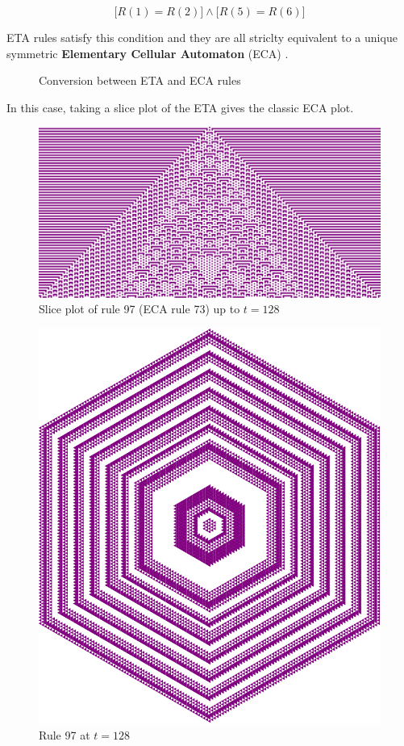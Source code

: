 \documentclass{article}
\begin{document}
\begin{equation}
    \Big[R(1)=R(2)\Big] \land \Big[R(5)=R(6)\Big]
\end{equation}

 ETA rules satisfy this condition and they are all striclty equivalent to a unique symmetric \textbf{Elementary Cellular Automaton} (ECA) \cite{wolfram2002new}.

\begin{figure}[H]
    \centering
    \caption{Conversion between ETA and ECA rules}
    \label{fig:ETA-to-ECA}
\end{figure}

\noindent In this case, taking a slice plot of the ETA gives the classic ECA plot.

\begin{figure}[H]
    \centering
    \includegraphics[width=.65\textwidth]{graphics/behavior/elementary-cellular-automata/rule-97-slice-plot-128.png}
    \caption{Slice plot of rule 97 (ECA rule 73) up to $t=128$}
    \label{fig:rule-97-slice-plot-128}
\end{figure}

\vspace{-10pt}

\begin{figure}[H]
    \centering
    \includegraphics[width=.4\textwidth]{graphics/behavior/elementary-cellular-automata/rule-97-time-128.pdf}
    \caption{Rule 97 at $t=128$}
    \label{fig:rule-97-time-128}
\end{figure}
\end{document}
